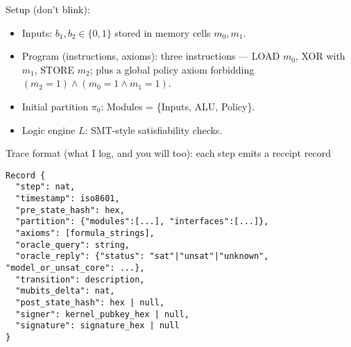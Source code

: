\documentclass[11pt]{article}
\begin{document}
Setup (don’t blink):
\begin{itemize}
  \item Inputs: $b_1, b_2 \in \{0,1\}$ stored in memory cells $m_0, m_1$.
  \item Program (instructions, axioms): three instructions — LOAD $m_0$, XOR with $m_1$, STORE $m_2$; plus a global policy axiom forbidding $(m_2 = 1) \land (m_0 = 1 \land m_1 = 1)$.
  \item Initial partition $\pi_0$: Modules = \{Inputs, ALU, Policy\}.
  \item Logic engine $L$: SMT-style satisfiability checks.
\end{itemize}

Trace format (what I log, and you will too): each step emits a receipt record
\begin{verbatim}
Record {
  "step": nat,
  "timestamp": iso8601,
  "pre_state_hash": hex,
  "partition": {"modules":[...], "interfaces":[...]},
  "axioms": [formula_strings],
  "oracle_query": string,
  "oracle_reply": {"status": "sat"|"unsat"|"unknown", "model_or_unsat_core": ...},
  "transition": description,
  "mubits_delta": nat,
  "post_state_hash": hex | null,
  "signer": kernel_pubkey_hex | null,
  "signature": signature_hex | null
}
\end{verbatim}
\end{document}
